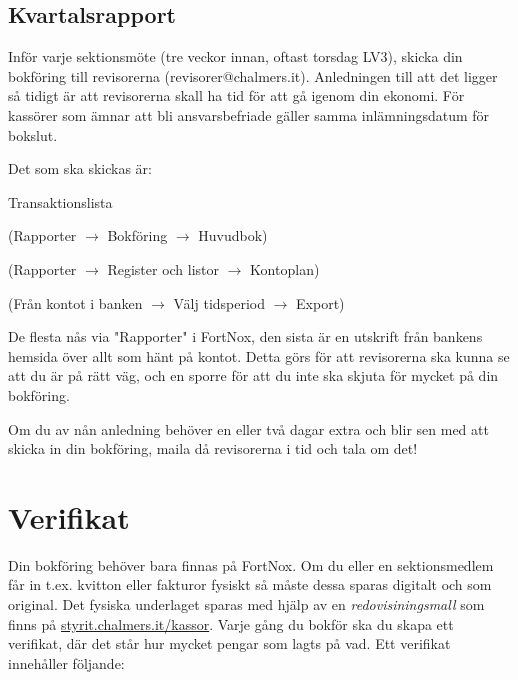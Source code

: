 \documentclass{article}
\begin{document}
\subsection*{Kvartalsrapport}
Inför varje sektionsmöte (tre veckor innan, oftast torsdag LV3), skicka din bokföring till revisorerna (revisorer@chalmers.it). Anledningen till att det ligger så tidigt är att revisorerna skall ha tid för att gå igenom din ekonomi.
För kassörer som ämnar att bli ansvarsbefriade gäller samma inlämningsdatum för bokslut.

Det som ska skickas är:
\begin{labeling}{Transaktionslista}
    \item [Huvudbok] \small{(Rapporter $\rightarrow$ Bokföring $\rightarrow$ Huvudbok)}
    \item [Kontoplan] \small{(Rapporter $\rightarrow$ Register och listor $\rightarrow$ Kontoplan)}
    \item [Transaktionslista] \small{(Från kontot i banken $\rightarrow$ Välj tidsperiod $\rightarrow$ Export)}
\end{labeling}

De flesta nås via "Rapporter" i FortNox, den sista är en utskrift från bankens hemsida över allt som hänt på kontot. Detta görs för att
revisorerna ska kunna se att du är på rätt väg, och en sporre för att du inte ska skjuta för mycket på din bokföring.

Om du av nån anledning behöver en eller två dagar extra och blir sen med att skicka in din bokföring, maila då revisorerna i tid och tala om det!

\newpage
\section{Verifikat}
Din bokföring behöver bara finnas på FortNox. Om du eller en sektionsmedlem får in t.ex. kvitton eller fakturor fysiskt så måste dessa sparas digitalt och som original. Det fysiska underlaget sparas med hjälp av en \textit{redovisiningsmall} som finns på \url{styrit.chalmers.it/kassor}. Varje gång du bokför ska du skapa ett verifikat, där det står hur mycket pengar som lagts på vad. Ett verifikat innehåller följande: 
\end{document}
